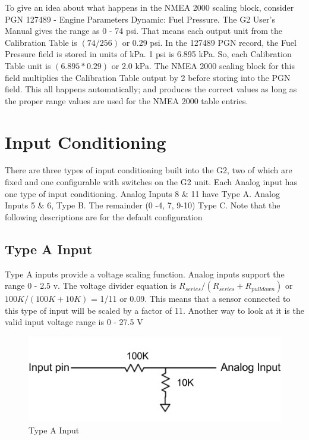 \documentclass[12pt, letterpaper, twoside, titlepage]{article}
\begin{document}
To give an idea about what happens in the NMEA 2000 scaling block, consider PGN 127489 - Engine Parameters Dynamic: Fuel  Pressure.  The G2 User’s Manual gives the range as 0 - 74 psi. That means each output unit from the Calibration Table is $ (74 / 256 )$ or 0.29 psi.  In the 127489 PGN record, the Fuel Pressure field is stored in units of kPa.  1 psi is 6.895 kPa.  So, each Calibration Table unit is  $(6.895 * 0.29 )$ or 2.0 kPa.   The NMEA 2000 scaling block for this field multiplies the Calibration Table output by 2 before storing into the PGN field.  This all happens automatically; and produces the correct values as long as the proper range values are used for the NMEA 2000 table entries.

\section{Input Conditioning}\label{Input Conditioning}
There are three types of input conditioning built into the G2, two of which are fixed and one configurable with switches on the G2 unit.  Each Analog input has one type of input conditioning.  Analog Inputs 8 \& 11 have  Type A.  Analog Inputs 5 \& 6, Type B.  The remainder (0 -4, 7, 9-10) Type C. Note that the following descriptions are for the default configuration


\subsection{Type A Input}
Type A inputs provide a voltage scaling function.  Analog inputs support the range 0 - 2.5 v.  The voltage divider equation is $ R_{series} / (R_{series} + R_{pulldown})$  or $100K / (100K + 10K)$ =  1/11 or 0.09.  This means that a sensor connected to this type of input will be scaled by a factor of 11. Another way to look at it is the valid  input voltage range is 0 - 27.5 V

\begin{figure}[hbt!]
  \includegraphics[scale=0.7]{Type A input.png}
  \centering
  \caption{Type A Input}
  \label{fig:Type A}
\end{figure}
\end{document}
